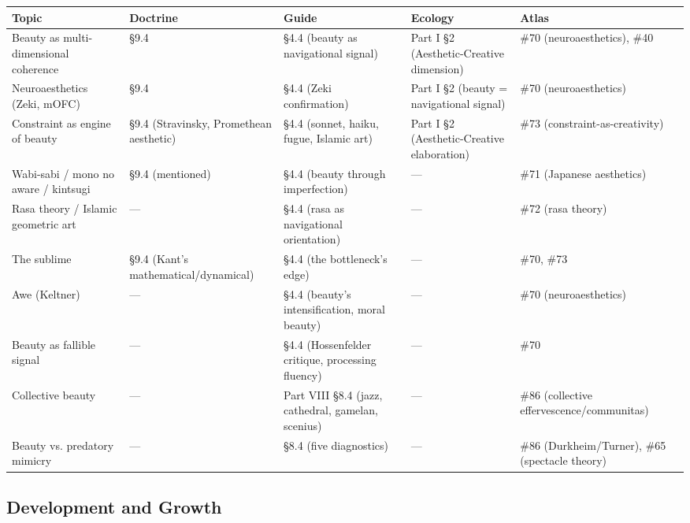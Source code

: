 \begin{longtable}{p{} p{} p{} p{} p{}}
\toprule
\textbf{Topic} & \textbf{Doctrine} & \textbf{Guide} & \textbf{Ecology} & \textbf{Atlas} \\
\midrule
\endhead
Beauty as multi-dimensional coherence & §9.4 & §4.4 (beauty as navigational signal) & Part I §2 (Aesthetic-Creative dimension) & \#70 (neuroaesthetics), \#40 \\
Neuroaesthetics (Zeki, mOFC) & §9.4 & §4.4 (Zeki confirmation) & Part I §2 (beauty = navigational signal) & \#70 (neuroaesthetics) \\
Constraint as engine of beauty & §9.4 (Stravinsky, Promethean aesthetic) & §4.4 (sonnet, haiku, fugue, Islamic art) & Part I §2 (Aesthetic-Creative elaboration) & \#73 (constraint-as-creativity) \\
Wabi-sabi / mono no aware / kintsugi & §9.4 (mentioned) & §4.4 (beauty through imperfection) & — & \#71 (Japanese aesthetics) \\
Rasa theory / Islamic geometric art & — & §4.4 (rasa as navigational orientation) & — & \#72 (rasa theory) \\
The sublime & §9.4 (Kant's mathematical/dynamical) & §4.4 (the bottleneck's edge) & — & \#70, \#73 \\
Awe (Keltner) & — & §4.4 (beauty's intensification, moral beauty) & — & \#70 (neuroaesthetics) \\
Beauty as fallible signal & — & §4.4 (Hossenfelder critique, processing fluency) & — & \#70 \\
Collective beauty & — & Part VIII §8.4 (jazz, cathedral, gamelan, scenius) & — & \#86 (collective effervescence/communitas) \\
Beauty vs. predatory mimicry & — & §8.4 (five diagnostics) & — & \#86 (Durkheim/Turner), \#65 (spectacle theory) \\
\bottomrule
\end{longtable}



\subsection*{Development and Growth}



